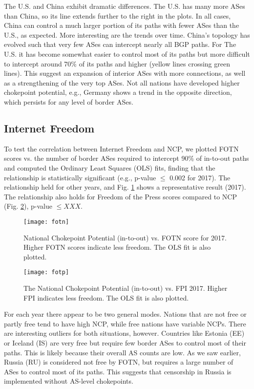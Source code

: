 The U.S. and China exhibit dramatic differences. The U.S. has many
more ASes than China, so its line extends further to the right in the
plots. In all cases, China can control a much larger portion of its
paths with fewer ASes than the U.S., as expected. More interesting are
the trends over time.  China's topology has evolved such that very few
ASes can intercept nearly all BGP paths. For The U.S. it has become
somewhat easier to control most of its paths but more difficult to
intercept around 70\% of its paths and higher (yellow lines crossing
green lines).  This suggest an expansion of interior ASes with more
connections, as well as a strengthening of the very top ASes.
Not all nations have developed higher chokepoint potential, e.g., Germany shows a trend
in the opposite direction, which persists for any level of border ASes.

\subsection{Internet Freedom}

To test the correlation between Internet Freedom and NCP, we plotted
FOTN scores vs. the number of border ASes required to intercept 90\% of in-to-out
paths and computed the Ordinary
Least Squares (OLS) fits, finding that the relationship is
statistically significant (e.g., p-value $\leq$ 0.002 for 2017). The
relationship held for other years, and 
Fig. \ref{fig:fotn} shows a representative result (2017).  The relationship also holds for Freedom of the Press scores compared to NCP (Fig. \ref{fig:fotp}), p-value $\leq XXX$.

\begin{figure}
	\centering
	\texttt{[image: fotn]}
	\caption{National Chokepoint Potential (in-to-out) vs. FOTN score
	for 2017. Higher FOTN scores indicate less freedom. The OLS fit is also plotted.}\label{fig:fotn}
\end{figure}

\begin{figure}
	\centering
	\texttt{[image: fotp]}
	\caption{The National Chokepoint Potential (in-to-out) vs. FPI
	2017. Higher FPI indicates less freedom. The OLS fit is also plotted.}\label{fig:fotp}
\end{figure}

For each year there appear to be two general modes.  Nations that are
not free or partly free tend to have high NCP, while free nations have
variable NCPs. There are interesting outliers for both situations,
however. Countries like Estonia (EE) or Iceland (IS) are very free but
require few border ASes to control most of their paths. This is likely
because their overall AS counts are low. As we saw earlier, Russia
(RU) is considered not free by FOTN, but requires a large number of
ASes to control most of its paths. This suggests that censorship
in Russia is implemented without AS-level
chokepoints.

